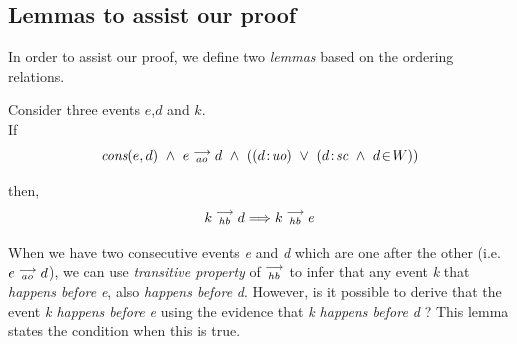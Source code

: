 \newcommand{\cons}[2]{\textit{cons}(#1,#2)}
  
    \subsection{Lemmas to assist our proof}    
    In order to assist our proof, we define two \textit{lemmas} based on the ordering relations. 
    
    \begin{lemma} Consider three events $e$,$d$ and $k$. \\
    
        If
            \[
                \cons{e}{d} \ \wedge \ \reln{e}{ao}{d} \ \wedge \
                (
                    (\et{d}{uo}) \ \vee \
                    (\et{d}{sc} \ \wedge \ \event{d}{W})
                )
            \]
            
        then,
            \[
                k\stackrel{\longrightarrow}{_{hb}}d \Longrightarrow k\stackrel{\longrightarrow}{_{hb}}e
            \]
          
        When we have two consecutive events \textit{e} and \textit{d} which are one after the other (i.e. $e\stackrel{\longrightarrow}{_{ao}}d$), we can use \textit{transitive property} of $\stackrel{\longrightarrow}{_{hb}}$ to infer that any event \textit{k} that \textit{happens before} \textit{e}, also \textit{happens before} \textit{d}. However, is it possible to derive that the event \textit{k happens before e} using the evidence that \textit{k happens before d} ? This lemma states the condition when this is true.
        
    \end{lemma}
    
